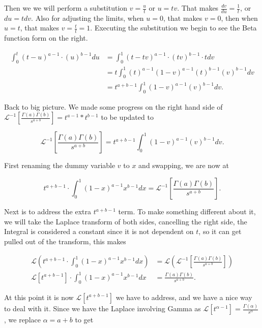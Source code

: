 \documentclass[12pt]{article}
\newcommand{\lp}{\mathscr{L}}
\begin{document}
Then we we will perform a substitution $v=\frac{u}{t}$ or $u=tv$. That makes $\frac{dv}{du}=\frac{1}{t}$, or $du = tdv$. Also for adjusting the limits, when $u=0$, that makes $v=0$, then when $u=t$, that makes $v=\frac{t}{t}=1$. Executing the substitution we begin to see the Beta function form on the right.

\begin{align*}
    \int_{0}^{t} (t-u)^{a-1} \cdot (u)^{b-1} du &= \int_{0}^{1} (t-tv)^{a-1} \cdot (tv)^{b-1}\cdot t dv \\
    &= t\int_{0}^{1} (t)^{a-1}(1-v)^{a-1}(t)^{b-1}(v)^{b-1} dv \\
    &=t^{a+b-1} \int_{0}^{1} (1-v)^{a-1}(v)^{b-1} dv.
\end{align*}

Back to big picture. We made some progress on the right hand side of $\lp^{-1}\left[\frac{\Gamma(a)\Gamma(b)}{s^{a+b}}\right] = t^{a-1} \ast t^{b-1}$ to be updated to

\begin{equation*}
    \lp^{-1}\left[\frac{\Gamma(a)\Gamma(b)}{s^{a+b}}\right] = t^{a+b-1} \int_{0}^{1} (1-v)^{a-1}(v)^{b-1} dv.
\end{equation*}

First renaming the dummy variable $v$ to $x$ and swapping, we are now at

\begin{equation*}
    t^{a+b-1} \cdot \int_{0}^{1} (1-x)^{a-1}x^{b-1} dx=\lp^{-1}\left[\frac{\Gamma(a)\Gamma(b)}{s^{a+b}}\right].
\end{equation*}

Next is to address the extra $t^{a+b-1}$ term. To make something different about it, we will take the Laplace transform of both sides, cancelling the right side, the Integral is considered a constant since it is not dependent on $t$, so it can get pulled out of the transform, this makes

\begin{align*}
    \lp\left(t^{a+b-1} \cdot \int_{0}^{1} (1-x)^{a-1}x^{b-1} dx\right) &= \lp(\lp^{-1}\left[\frac{\Gamma(a)\Gamma(b)}{s^{a+b}}\right]) \\
    \lp[t^{a+b-1}] \cdot \int_{0}^{1} (1-x)^{a-1}x^{b-1} dx &= \frac{\Gamma(a)\Gamma(b)}{s^{a+b}}.
\end{align*}

At this point it is now $\lp[t^{a+b-1}]$ we have to address, and we have a nice way to deal with it. Since we have the Laplace involving Gamma as $\lp[t^{\alpha-1}]=\frac{\Gamma(\alpha)}{s^{\alpha}}$, we replace $\alpha=a+b$ to get
\end{document}
